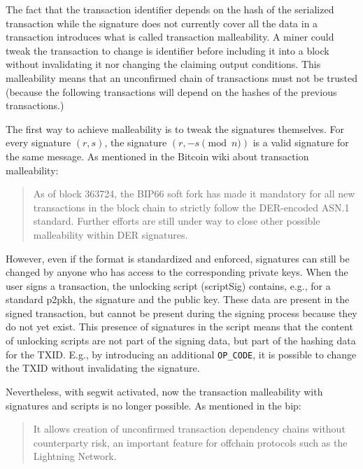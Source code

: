 The fact that the transaction identifier depends on the hash of the serialized
transaction while the signature does not currently cover all the data in a
transaction introduces what is called transaction malleability. A miner
could tweak the transaction to change is identifier before including it into a
block without invalidating it nor changing the claiming output conditions. This
malleability means that an unconfirmed chain of transactions must not be trusted
(because the following transactions will depend on the hashes of the previous
transactions.)

The first way to achieve malleability is to tweak the signatures themselves. For
every signature $(r, s)$, the signature $(r, -s \pmod n)$ is a valid signature
for the same message. As mentioned in the Bitcoin wiki about transaction
malleability:

\begin{quote}
	As of block 363724, the BIP66 soft fork has made it mandatory for all new
	transactions in the block chain to strictly follow the DER-encoded ASN.1 standard.
	Further efforts are still under way to close other possible malleability within
	DER signatures.
\end{quote}

However, even if the format is standardized and enforced, signatures can still
be changed by anyone who has access to the corresponding private keys. When the
user signs a transaction, the unlocking script (scriptSig) contains, e.g., for a
standard \gls{p2pkh}, the signature and the public key. These data are present
in the signed transaction, but cannot be present during the signing process
because they do not yet exist. This presence of signatures in the script means
that the content of unlocking scripts are not part of the signing data, but part
of the hashing data for the TXID. E.g., by introducing an additional
\texttt{OP\_CODE}, it is possible to change the TXID without invalidating the
signature.

Nevertheless, with \gls{segwit} activated, now the transaction malleability with
signatures and scripts is no longer possible. As mentioned in the \gls{bip}:

\begin{quote}
	It allows creation of unconfirmed transaction dependency chains without
	counterparty risk, an important feature for offchain protocols such as the
	Lightning Network.
\end{quote}


